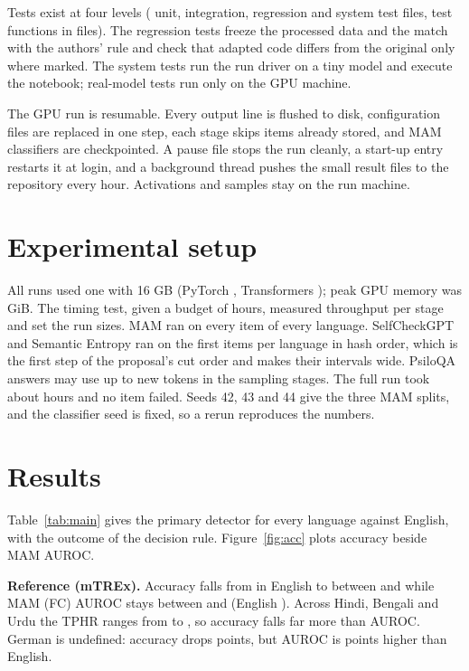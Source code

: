 \documentclass[12pt]{article}
\begin{document}
Tests exist at four levels (\testsunit{} unit, \testsintegration{} integration, \testsregression{} regression and \testssystem{} system test files, \testfuncs{} test functions in \testfiles{} files). The regression tests freeze the processed data and the match with the authors' rule and check that adapted code differs from the original only where marked. The system tests run the run driver on a tiny model and execute the notebook; real-model tests run only on the GPU machine.

The GPU run is resumable. Every output line is flushed to disk, configuration files are replaced in one step, each stage skips items already stored, and MAM classifiers are checkpointed. A pause file stops the run cleanly, a start-up entry restarts it at login, and a background thread pushes the small result files to the repository every hour. Activations and samples stay on the run machine.

\section{Experimental setup}
All runs used one \gpuname{} with 16 GB (PyTorch \torchver{}, Transformers \transformersver{}); peak GPU memory was \peakvram{} GiB. The timing test, given a budget of \timinghours{} hours, measured throughput per stage and set the run sizes. MAM ran on every item of every language. SelfCheckGPT and Semantic Entropy ran on the first \samplingn{} items per language in hash order, which is the first step of the proposal's cut order and makes their intervals wide. PsiloQA answers may use up to \psiloqamaxtokens{} new tokens in the sampling stages. The full run took about \runhours{} hours and no item failed. Seeds 42, 43 and 44 give the three MAM splits, and the classifier seed is fixed, so a rerun reproduces the numbers.

\section{Results}
Table~\ref{tab:main} gives the primary detector for every language against English, with the outcome of the decision rule. Figure~\ref{fig:acc} plots accuracy beside MAM AUROC.



\textbf{Reference (mTREx).} Accuracy falls from \mtenacc{} in English to between \mtacclo{} and \mtacchi{} while MAM (FC) AUROC stays between \mtfclo{} and \mtfchi{} (English \mtenau{}). Across Hindi, Bengali and Urdu the TPHR ranges from \rnglo{} to \rnghi{}, so accuracy falls far more than AUROC. German is undefined: accuracy drops \dedacc{} points, but AUROC is \dedauroc{} points higher than English.
\end{document}
